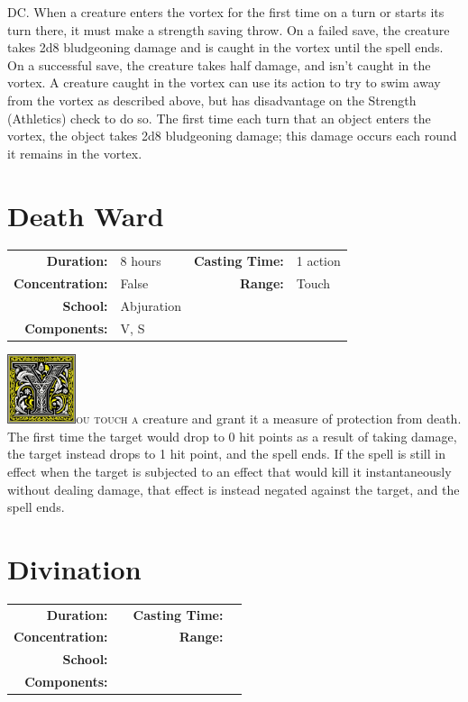 \documentclass[12pt,showtrims]{memoir}
\begin{document}
DC. When a creature enters the vortex for the first time on a turn or starts its turn there, it must make a strength saving throw. On a failed save, the creature takes 2d8 bludgeoning damage and is caught in the vortex until the spell ends. On a successful save, the creature takes half damage, and isn't caught in the vortex. A creature caught in the vortex can use its action to try to swim away from the vortex as described above, but has disadvantage on the Strength (Athletics) check to do so. The first time each turn that an object enters the vortex, the object takes 2d8 bludgeoning damage; this damage occurs each round it remains in the vortex.

\newpage
\section*{Death Ward}

{
\small\centering\vspace{-6pt}
\begin{tabular}{rlrl}
\toprule

\textbf{Duration:} & 8 hours &
\textbf{Casting Time:} & 1 action \\
\textbf{Concentration:} & False &
\textbf{Range:} & Touch \\
\textbf{School:} & Abjuration \\
\textbf{Components:} & \multicolumn{3}{p{0.7\textwidth}}{V, S}\\

\bottomrule
\end{tabular}
}

\vspace{1\baselineskip}\noindent 
\lettrine[lines=4]{\includegraphics[height=58pt]{initials/Y.png}}{ou touch a} creature and grant it a measure of protection from death. The first time the target would drop to 0 hit points as a result of taking damage, the target instead drops to 1 hit point, and the spell ends. If the spell is still in effect when the target is subjected to an effect that would kill it instantaneously without dealing damage, that effect is instead negated against the target, and the spell ends.

\newpage
\section*{Divination}
{
\small\centering\vspace{-6pt}
\begin{tabular}{rlrl}
\toprule

\textbf{Duration:} &  &
\textbf{Casting Time:} &  \\
\textbf{Concentration:} & &
\textbf{Range:} &  \\
\textbf{School:} &  \\
\textbf{Components:} & \multicolumn{3}{p{0.7\textwidth}}{}\\

\bottomrule
\end{tabular}
}
\newpage
\end{document}
